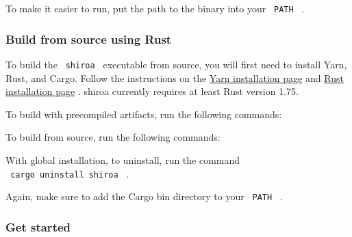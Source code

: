 To make it easier to run, put the path to the binary into your
\texttt{\ PATH\ } .

\subsubsection{Build from source using
Rust}\label{build-from-source-using-rust}

To build the \texttt{\ shiroa\ } executable from source, you will first
need to install Yarn, Rust, and Cargo. Follow the instructions on the
\href{https://classic.yarnpkg.com/en/docs/install}{Yarn installation
page} and \href{https://www.rust-lang.org/tools/install}{Rust
installation page} . shiroa currently requires at least Rust version
1.75.

To build with precompiled artifacts, run the following commands:

\begin{Shaded}
\begin{Highlighting}[]
\end{Highlighting}
\end{Shaded}

To build from source, run the following commands:

\begin{Shaded}
\begin{Highlighting}[]
 
\end{Highlighting}
\end{Shaded}

With global installation, to uninstall, run the command
\texttt{\ cargo\ uninstall\ shiroa\ } .

Again, make sure to add the Cargo bin directory to your
\texttt{\ PATH\ } .

\subsubsection{Get started}\label{get-started}


